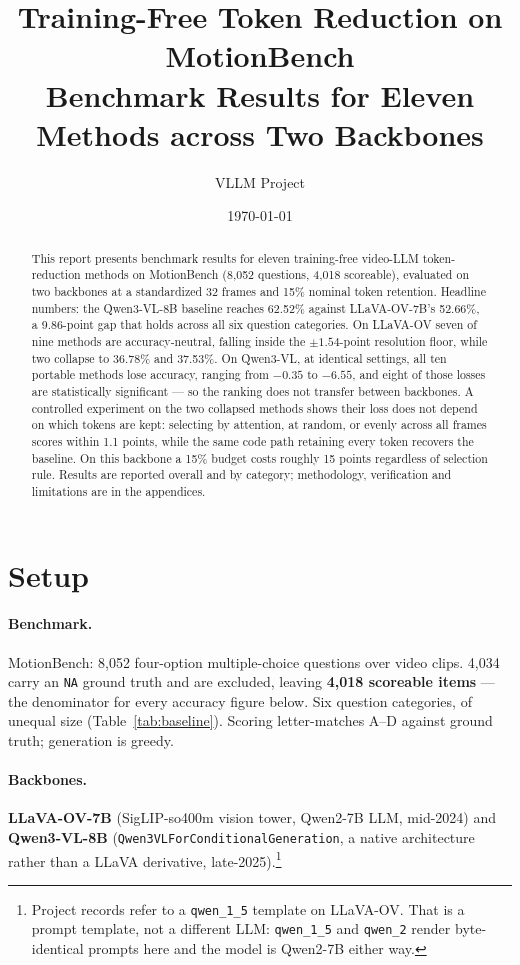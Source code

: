 \documentclass[11pt]{article}
\title{Training-Free Token Reduction on MotionBench\\
\large Benchmark Results for Eleven Methods across Two Backbones}
\author{VLLM Project}
\date{\today}
\begin{document}
\maketitle

\begin{abstract}
This report presents benchmark results for eleven training-free video-LLM
token-reduction methods on MotionBench (8{,}052 questions, 4{,}018
scoreable), evaluated on two backbones at a standardized 32 frames and 15\%
nominal token retention. Headline numbers: the Qwen3-VL-8B baseline reaches
62.52\% against LLaVA-OV-7B's 52.66\%, a 9.86-point gap that holds across
all six question categories. On LLaVA-OV seven of nine methods are
accuracy-neutral, falling inside the $\pm1.54$-point resolution floor, while
two collapse to 36.78\% and 37.53\%. On Qwen3-VL, at identical settings, all
ten portable methods lose accuracy, ranging from $-0.35$ to $-6.55$, and
eight of those losses are statistically significant --- so the ranking does
not transfer between backbones. A controlled experiment on the two collapsed
methods shows their loss does not depend on which tokens are kept: selecting
by attention, at random, or evenly across all frames scores within 1.1
points, while the same code path retaining every token recovers the
baseline. On this backbone a 15\% budget costs roughly 15 points regardless
of selection rule. Results are reported overall and by category;
methodology, verification and limitations are in the appendices.
\end{abstract}

\tableofcontents

\section{Setup}
\label{sec:setup}

\paragraph{Benchmark.} MotionBench: 8{,}052 four-option multiple-choice
questions over video clips. 4{,}034 carry an \texttt{NA} ground truth and
are excluded, leaving \textbf{4{,}018 scoreable items} --- the denominator
for every accuracy figure below. Six question categories, of unequal size
(Table~\ref{tab:baseline}). Scoring letter-matches A--D against ground
truth; generation is greedy.

\paragraph{Backbones.} \textbf{LLaVA-OV-7B} (SigLIP-so400m vision tower,
Qwen2-7B LLM, mid-2024) and \textbf{Qwen3-VL-8B}
(\texttt{Qwen3VLForConditionalGeneration}, a native architecture rather than
a LLaVA derivative, late-2025).\footnote{Project records refer to a
\texttt{qwen\_1\_5} template on LLaVA-OV. That is a prompt template, not a
different LLM: \texttt{qwen\_1\_5} and \texttt{qwen\_2} render
byte-identical prompts here and the model is Qwen2-7B either way.}
\end{document}

